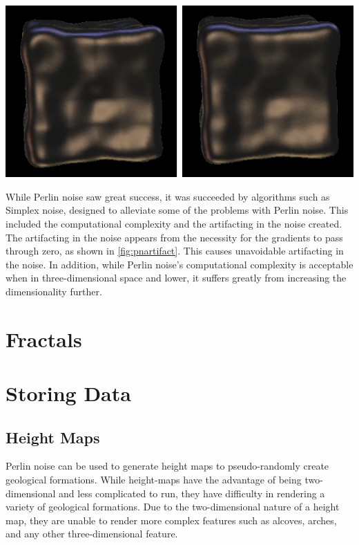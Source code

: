 \documentclass[10pt]{report}
\begin{document}
		\begin{minipage}{\textwidth}
			\centering
			\includegraphics[scale=.5]{s-curve}
			\label{fig:pnartifact}
		\end{minipage} 
		
		While Perlin noise saw great success, it was succeeded by algorithms such as Simplex noise, designed to alleviate some of the problems with Perlin noise. This included the computational complexity and the artifacting in the noise created. The artifacting in the noise appears from the necessity for the gradients to pass through zero, as shown in \autoref{fig:pnartifact}. This causes unavoidable artifacting in the noise. In addition, while Perlin noise's computational complexity is acceptable when in three-dimensional space and lower, it suffers greatly from increasing the dimensionality further.
	
	\vspace{10pt}
	\let\clearpage\relax
	\chapter{Fractals}
		
	\vspace{10pt}
	\let\clearpage\relax
	\chapter{Storing Data}
	
		\section{Height Maps}
		
		Perlin noise can be used to generate height maps to pseudo-randomly create geological formations. While height-maps have the advantage of being two-dimensional and less complicated to run, they have difficulty in rendering a variety of geological formations. Due to the two-dimensional nature of a height map, they are unable to render more complex features such as alcoves, arches, and any other three-dimensional feature. 
		
\end{document}
